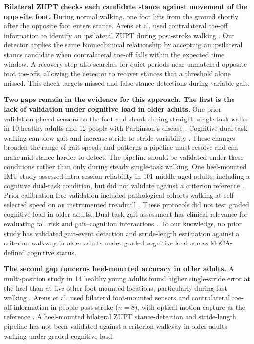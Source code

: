 \documentclass[fleqn,10pt,lineno]{wlpeerj}
\begin{document}
\textbf{Bilateral ZUPT checks each candidate stance against movement of the opposite foot.}
During normal walking, one foot lifts from the ground shortly after the opposite foot enters stance. Arens et al. used contralateral toe-off information to identify an ipsilateral ZUPT during post-stroke walking \citep{Arens2021}. Our detector applies the same biomechanical relationship by accepting an ipsilateral stance candidate when contralateral toe-off falls within the expected time window. A recovery step also searches for quiet periods near unmatched opposite-foot toe-offs, allowing the detector to recover stances that a threshold alone missed. This check targets missed and false stance detections during variable gait.

\textbf{Two gaps remain in the evidence for this approach. The first is the lack of validation under cognitive load in older adults.}
One prior validation placed sensors on the foot and shank during straight, single-task walks in 10 healthy adults and 12 people with Parkinson's disease \citep{Sijobert2015}. Cognitive dual-task walking can slow gait and increase stride-to-stride variability \citep{Beauchet2005, Yogev-Seligmann2008, Hausdorff2008}. These changes broaden the range of gait speeds and patterns a pipeline must resolve and can make mid-stance harder to detect. The pipeline should be validated under these conditions rather than only during steady single-task walking. One heel-mounted IMU study assessed intra-session reliability in 101 middle-aged adults, including a cognitive dual-task condition, but did not validate against a criterion reference \citep{Boutaayamou2025}. Prior calibration-free validation included pathological cohorts walking at self-selected speed on an instrumented treadmill \citep{Laidig2021}. These protocols did not test graded cognitive load in older adults. Dual-task gait assessment has clinical relevance for evaluating fall risk and gait--cognition interactions \citep{Montero-Odasso2012, Commandeur2018, Springer2006}. To our knowledge, no prior study has validated gait-event detection and stride-length estimation against a criterion walkway in older adults under graded cognitive load across MoCA-defined cognitive status.

\textbf{The second gap concerns heel-mounted accuracy in older adults.}
A multi-position study in 14 healthy young adults found higher single-stride error at the heel than at five other foot-mounted locations, particularly during fast walking \citep{Kuderle2022}. Arens et al. used bilateral foot-mounted sensors and contralateral toe-off information in people post-stroke ($n = 8$), with optical motion capture as the reference \citep{Arens2021}. A heel-mounted bilateral ZUPT stance-detection and stride-length pipeline has not been validated against a criterion walkway in older adults walking under graded cognitive load.
\end{document}
